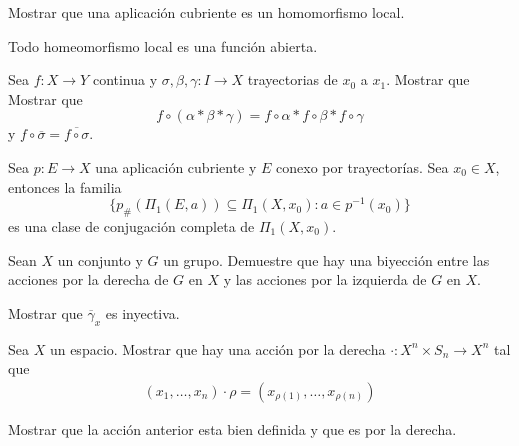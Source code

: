\begin{ejercicio}
    Mostrar que una aplicación cubriente es un homomorfismo local.
\end{ejercicio}

\begin{ejercicio}
    Todo homeomorfismo local es una función abierta.
\end{ejercicio}

\begin{ejercicio}
    Sea $f:X\to Y$ continua y $\sigma,\beta,\gamma:I\to X$ trayectorias de $x_0$ a $x_1$. Mostrar que
    Mostrar que 
    \begin{equation*}
        f\circ(\alpha*\beta*\gamma)=f\circ\alpha*f\circ\beta*f\circ\gamma
    \end{equation*}
    y $f\circ\overline{\sigma}=\overline{f\circ\sigma}$.
\end{ejercicio}

\begin{ejercicio}
    Sea $p:E\to X$ una aplicación cubriente y $E$ conexo por trayectorías. Sea $x_0\in X$, entonces la familia
    \begin{equation*}
        \{p_\#(\Pi_1(E,a))\subseteq \Pi_1(X,x_0):a\in p^{-1}(x_0)\}
    \end{equation*}
    es una clase de conjugación completa de $\Pi_1(X,x_0).$
\end{ejercicio}

\begin{ejercicio}
   Sean $X$ un conjunto y $G$ un grupo. Demuestre que hay una biyección entre las acciones por la derecha de $G$ en $X$ y las acciones por la izquierda de $G$ en $X$.
\end{ejercicio}

\begin{ejercicio}
    Mostrar que $\overline{\gamma}_x$ es inyectiva.
\end{ejercicio}

\begin{ejercicio}
    Sea $X$ un espacio. Mostrar que hay una acción por la derecha $\cdot: X^n\times S_n\to X^n$ tal que
    \begin{align*}
        (x_1,\ldots,x_n)\cdot \rho=(x_{\rho(1)},\ldots,x_{\rho(n)})
    \end{align*}
\end{ejercicio}

\begin{ejercicio}
    Mostrar que la acción anterior esta bien definida y que es por la derecha.
\end{ejercicio}

